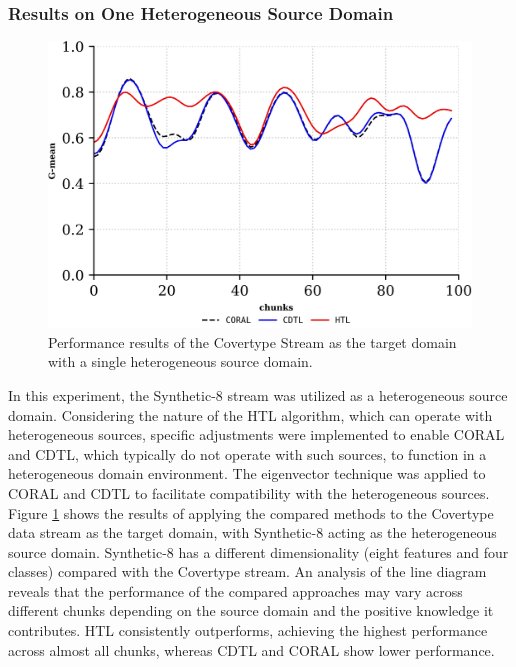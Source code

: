 \subsubsection{Results on One Heterogeneous Source Domain}
\begin{figure}[H]
	\centering
	\includegraphics[width=0.6\linewidth]{6_transfer_learning/figures/exp2_0.png}
  \caption{Performance results of the Covertype Stream as the target domain with a single heterogeneous source domain.}

	\label{fig:6_exp3}
\end{figure}
In this experiment, the Synthetic-8 stream was utilized as a heterogeneous source domain. Considering the nature of the HTL algorithm, which can operate with heterogeneous sources, specific adjustments were implemented to enable CORAL and CDTL, which typically do not operate with such sources, to function in a heterogeneous domain environment. The eigenvector technique was applied to CORAL and CDTL to facilitate compatibility with the heterogeneous sources. Figure \ref{fig:6_exp3} shows the results of applying the compared methods to the Covertype data stream as the target domain, with Synthetic-8 acting as the heterogeneous source domain. Synthetic-8 has a different dimensionality (eight features and four classes) compared with the Covertype stream. An analysis of the line diagram reveals that the performance of the compared approaches may vary across different chunks depending on the source domain and the positive knowledge it contributes. HTL consistently outperforms, achieving the highest performance across almost all chunks, whereas CDTL and CORAL show lower performance.





